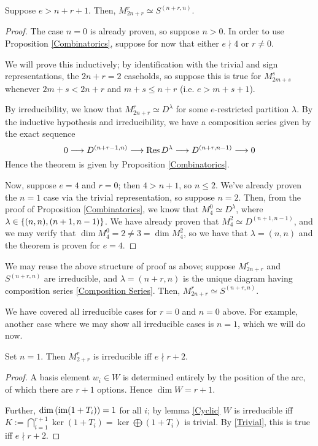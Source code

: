 \documentclass{amsart}
\begin{document}
\begin{theorem}
  Suppose $e > n + r + 1$.
  Then, $M_{2n + r}^r \simeq S^{(n+r,n)}$.
\end{theorem}
\begin{proof}
  The case $n = 0$ is already proven, so suppose $n > 0$.
  In order to use Proposition \ref{Combinatorics}, suppose for now that either $e \nmid 4$ or $r \neq 0$.

  We will prove this inductively; by identification with the trivial and sign representations, the $2n + r = 2$ caseholds, so suppose this is true for $M_{2m + s}^s$ whenever $2m + s < 2n + r$ and $m + s \leq n + r$ (i.e. $e > m + s + 1$).

  By irreducibility, we know that $M_{2n + r}^r \simeq D^\lambda$ for some $e$-restricted partition $\lambda$.
  By the inductive hypothesis and irreducibility, we have a composition series given by the exact sequence
  \begin{equation}
    \label{Composition Series} 0 \longrightarrow D^{(n + r - 1,n)} \longrightarrow \text{Res} \, D^\lambda \longrightarrow D^{(n+r,n-1)} \longrightarrow 0
   \end{equation}
  Hence the theorem is given by Proposition \ref{Combinatorics}.

  Now, suppose $e = 4$ and $r = 0$;
  then $4 > n + 1$, so $n \leq 2$.
  We've already proven the $n = 1$ case via the trivial representation, so suppose $n = 2$.
  Then, from the proof of Proposition \ref{Combinatorics}, we know that $M_{4}^0 \simeq D^\lambda$, where $\lambda \in \left\{ (n,n), (n+1,n-1) \right\}$.
  We have already proven that $M_4^2 \simeq D^{(n+1,n-1)}$, and we may verify that $\dim M_4^0 = 2 \neq 3 = \dim M_4^2$, so we have that $\lambda = (n,n)$ and the theorem is proven for $e = 4$.
\end{proof}

\iffalse
We may reuse the above structure of proof as above;
suppose $M_{2n + r}^r$ and $S^{(n+r,n)}$ are irreducible, and $\lambda = (n+r,n)$ is the unique diagram having composition series \eqref{Composition Series}.
Then, $M_{2n + r}^r \simeq S^{(n+r,n)}$.

We have covered all irreducible cases for $r = 0$ and $n = 0$ above.
For example, another case where we may show all irreducible cases is $n = 1$, which we will do now.
\begin{lemma}\label{n=1 irreducibility}
    Set $n = 1$. 
    Then $M_{2 + r}^r$ is irreducible iff $e \nmid r + 2$.
\end{lemma}
\begin{proof}
  A basis element $w_i \in W$ is determined entirely by the position of the arc, of which there are $r + 1$ options.
  Hence $\dim W = r + 1$.

  Further, $\text{dim}\left( \text{im} (1 + T_i) \right) = 1$ for all $i$;
  by lemma \ref{Cyclic} $W$ is irreducible iff $K := \bigcap_{i = 1}^{r+1} \ker (1 + T_i) = \ker \bigoplus (1 + T_i)$ is trivial.
  By \ref{Trivial}, this is true iff $e \nmid r + 2$.
\end{proof}
\end{document}
